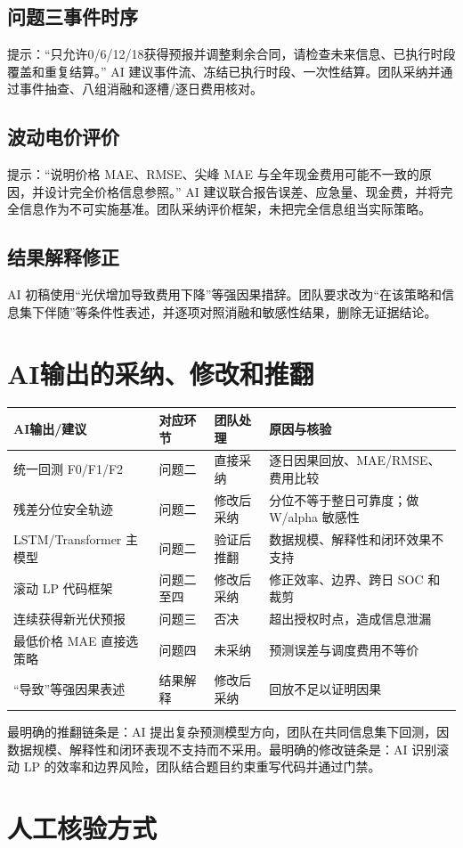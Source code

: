 \documentclass[UTF8,a4paper,11pt]{ctexart}
\begin{document}
\subsection{问题三事件时序}
提示：“只允许0/6/12/18获得预报并调整剩余合同，请检查未来信息、已执行时段覆盖和重复结算。” AI 建议事件流、冻结已执行时段、一次性结算。团队采纳并通过事件抽查、八组消融和逐槽/逐日费用核对。
\subsection{波动电价评价}
提示：“说明价格 MAE、RMSE、尖峰 MAE 与全年现金费用可能不一致的原因，并设计完全价格信息参照。” AI 建议联合报告误差、应急量、现金费，并将完全信息作为不可实施基准。团队采纳评价框架，未把完全信息组当实际策略。
\subsection{结果解释修正}
AI 初稿使用“光伏增加导致费用下降”等强因果措辞。团队要求改为“在该策略和信息集下伴随”等条件性表述，并逐项对照消融和敏感性结果，删除无证据结论。
\section{AI输出的采纳、修改和推翻}
\begin{longtable}{p{}p{}p{}p{}}
\toprule AI输出/建议 & 对应环节 & 团队处理 & 原因与核验\\\midrule
统一回测 F0/F1/F2 & 问题二 & 直接采纳 & 逐日因果回放、MAE/RMSE、费用比较\\
残差分位安全轨迹 & 问题二 & 修改后采纳 & 分位不等于整日可靠度；做 W/alpha 敏感性\\
LSTM/Transformer 主模型 & 问题二 & 验证后推翻 & 数据规模、解释性和闭环效果不支持\\
滚动 LP 代码框架 & 问题二至四 & 修改后采纳 & 修正效率、边界、跨日 SOC 和裁剪\\
连续获得新光伏预报 & 问题三 & 否决 & 超出授权时点，造成信息泄漏\\
最低价格 MAE 直接选策略 & 问题四 & 未采纳 & 预测误差与调度费用不等价\\
“导致”等强因果表述 & 结果解释 & 修改后采纳 & 回放不足以证明因果\\
\bottomrule
\end{longtable}
最明确的推翻链条是：AI 提出复杂预测模型方向，团队在共同信息集下回测，因数据规模、解释性和闭环表现不支持而不采用。最明确的修改链条是：AI 识别滚动 LP 的效率和边界风险，团队结合题目约束重写代码并通过门禁。
\section{人工核验方式}
\end{document}
